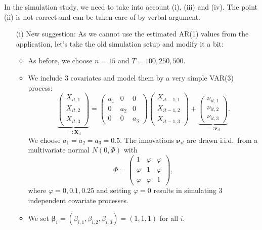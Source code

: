 \documentclass[a4paper,12pt]{article}
\begin{document}
\begin{enumerate}[label=\arabic*.,leftmargin=0.6cm]
{\color{blue}  
In the simulation study, we need to take into account (i), (iii) and (iv). The point (ii) is not correct and can be taken care of by verbal argument.
\begin{itemize}[topsep=0pt]
 
\item[(i)] New suggestion: As we cannot use the estimated AR(1) values from the application, let's take the old simulation setup and modify it a bit: 

\begin{itemize}[label=--,leftmargin=0.45cm,itemsep=0pt]

\item As before, we choose $n=15$ and $T=100,250,500$.
  
\item We include $3$ covariates and model them by a very simple VAR(3) process:
\[ \underbrace{\begin{pmatrix} X_{it,1} \\ X_{it,2} \\ X_{it,3} \end{pmatrix}}_{=: \boldsymbol{X}_{it}} = \begin{pmatrix} a_1 & 0 & 0 \\ 0 & a_2 & 0 \\ 0 & 0 & a_3 \end{pmatrix} \begin{pmatrix} X_{it-1,1} \\ X_{it-1,2} \\ X_{it-1,3} \end{pmatrix} + \underbrace{\begin{pmatrix} \nu_{it,1} \\ \nu_{it,2} \\ \nu_{it,3} \end{pmatrix}}_{=: \boldsymbol{\nu}_{it}}. \] 
We choose $a_1 = a_2 = a_3 = 0.5$. The innovations $\boldsymbol{\nu}_{it}$ are drawn i.i.d.\ from a multivariate normal $N(0,\Phi)$ with
\[ \Phi = \begin{pmatrix} 1 & \varphi & \varphi \\ \varphi & 1 & \varphi \\ \varphi & \varphi & 1 \end{pmatrix}, \]
where $\varphi=0, 0.1, 0.25$ and setting $\varphi = 0$ results in simulating 3 independent covariate processes.

\item We set $\boldsymbol{\beta}_i = (\beta_{i,1},\beta_{i,2},\beta_{i,3}) = (1,1,1)$ for all $i$.


\end{itemize}
\end{itemize}}
\end{enumerate}
\end{document}
